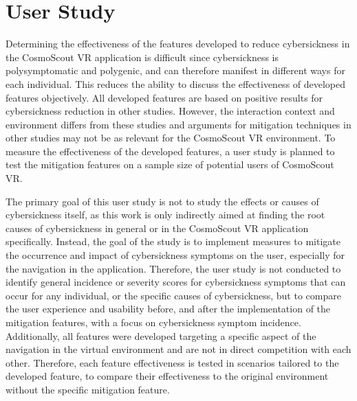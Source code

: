 \chapter{User Study}\label{ch:user-study}

Determining the effectiveness of the features developed to reduce cybersickness in the CosmoScout VR application is
difficult since cybersickness is polysymptomatic and polygenic, and can therefore manifest in different ways for each
individual.
This reduces the ability to discuss the effectiveness of developed features objectively.
All developed features are based on positive results for cybersickness reduction in other studies.
However, the interaction context and environment differs from these studies and arguments for mitigation techniques
in other studies may not be as relevant for the CosmoScout VR environment.
To measure the effectiveness of the developed features, a user study is planned to test the mitigation features on a
sample size of potential users of CosmoScout VR\@.

The primary goal of this user study is not to study the effects or causes of cybersickness itself, as this work is
only indirectly aimed at finding the root causes of cybersickness in general or in the CosmoScout VR application
specifically.
Instead, the goal of the study is to implement measures to mitigate the occurrence and impact of cybersickness
symptoms on the user, especially for the navigation in the application.
Therefore, the user study is not conducted to identify general incidence or severity scores for cybersickness symptoms
that can occur for any individual, or the specific causes of cybersickness, but to compare the user experience and
usability before, and after the implementation of the mitigation features, with a focus on cybersickness symptom
incidence.
Additionally, all features were developed targeting a specific aspect of the navigation in the virtual environment
and are not in direct competition with each other.
Therefore, each feature effectiveness is tested in scenarios tailored to the developed feature, to compare their
effectiveness to the original environment without the specific mitigation feature.

